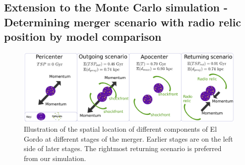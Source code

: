\documentclass[letterpaper,useAMS,usenatbib]{mn2e}
\begin{document}
\subsection{Extension to the Monte Carlo simulation - Determining merger
scenario with radio relic position by model comparison}
\begin{figure}
	\includegraphics[width=\linewidth]{merger_cartoon_white_bg.pdf}
	\caption{
		Illustration of the spatial location of different components of El Gordo at
		different stages of the merger. Earlier stages are on the left side of later stages. The rightmost returning scenario is preferred from our simulation. 
	} 
	\label{fig:merger_cartoon}
\end{figure}
\end{document}
